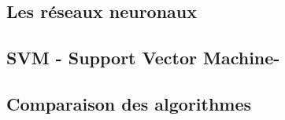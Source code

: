 \subsection{Les réseaux neuronaux}
\label{ILe Machine Learning: Les différents algorithmes: Les réseaux neuronaux}

\subsection{SVM - Support Vector Machine-}
\label{ILe Machine Learning: Les différents algorithmes: SVM}

\subsection{Comparaison des algorithmes}
\label{ILe Machine Learning: Les différents algorithmes: Comparaison des algorithmes}